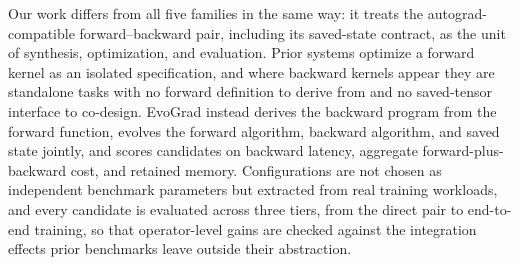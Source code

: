 Our work differs from all five families in the same way: it treats the autograd-compatible forward--backward pair, including its saved-state contract, as the unit of synthesis, optimization, and evaluation. Prior systems optimize a forward kernel as an isolated specification, and where backward kernels appear they are standalone tasks with no forward definition to derive from and no saved-tensor interface to co-design. EvoGrad instead derives the backward program from the forward function, evolves the forward algorithm, backward algorithm, and saved state jointly, and scores candidates on backward latency, aggregate forward-plus-backward cost, and retained memory. Configurations are not chosen as independent benchmark parameters but extracted from real training workloads, and every candidate is evaluated across three tiers, from the direct pair to end-to-end training, so that operator-level gains are checked against the integration effects prior benchmarks leave outside their abstraction.  


